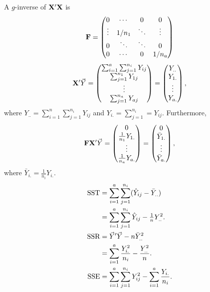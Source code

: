 A $ g $-inverse of $ \mathbf{X}'\mathbf{X} $ is
\[ \mathbf{F}=\begin{pmatrix}
        0      & \cdots & 0      & 0      \\
        \vdots & 1/n_1  & \ddots & \vdots \\
        0      & \ddots & \ddots & 0      \\
        0      & \cdots & 0      & 1/n_a
    \end{pmatrix} \]
\[ \mathbf{X}'\vec{Y}=\begin{pmatrix}
        \sum_{i=1}^{a}\sum_{j=1}^{n_i}Y_{ij} \\
        \sum_{j=1}^{n_1}Y_{1j}               \\
        \vdots                               \\
        \sum_{j=1}^{n_a}Y_{aj}
    \end{pmatrix}=\begin{pmatrix}
        Y_{..} \\
        Y_{1.} \\
        \vdots \\
        Y_{a.}
    \end{pmatrix}, \]
where $ Y_{..}=\sum_{i=1}^{n}\sum_{j=1}^{n_i}Y_{ij} $
and $ Y_{i.}=\sum_{j=1}^{n_i}=Y_{ij} $. Furthermore,
\[ \mathbf{F}\mathbf{X}'\vec{Y}=\begin{pmatrix}
        0                   \\
        \frac{1}{n_1}Y_{1.} \\
        \vdots              \\
        \frac{1}{n_a}Y_{a.}
    \end{pmatrix}=\begin{pmatrix}
        0            \\
        \bar{Y}_{1.} \\
        \vdots       \\
        \bar{Y}_{a.}
    \end{pmatrix}, \]
where $ \bar{Y}_{i.}=\frac{1}{n_i}Y_{i.} $.
\begin{align*}
    \text{SST}
     & =\sum_{i=1}^{a}\sum_{j=1}^{n_i}(\hat{Y}_{ij}-\bar{Y}_{..})                \\
     & =\sum_{i=1}^{a}\sum_{j=1}^{n_i}\hat{Y}_{ij}-\tfrac{1}{n}Y_{..}^2.         \\
    \text{SSR}
     & =\vec{Y}'\vec{Y}-n\bar{Y}_{..}^2                                    \\
     & =\sum_{i=1}^{a}\frac{Y_{i.}^2}{n_i}-\frac{Y_{..}^2}{n}.                   \\
    \text{SSE}
     & =\sum_{i=1}^{a}\sum_{j=1}^{n_i}Y_{ij}^2-\sum_{i=1}^{a}\frac{Y_{i.}}{n_i}.
\end{align*}
